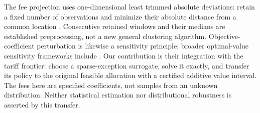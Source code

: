 The fee projection uses one-dimensional least trimmed absolute deviations: retain a fixed number of observations and minimize their absolute distance from a common location \citep{Tableman1994,Zioutas2015}. Consecutive retained windows and their medians are established preprocessing, not a new general clustering algorithm. Objective-coefficient perturbation is likewise a sensitivity principle; broader optimal-value sensitivity frameworks include \citet{XuBurer2017}. Our contribution is their integration with the tariff frontier: choose a sparse-exception surrogate, solve it exactly, and transfer its policy to the original feasible allocation with a certified additive value interval. The fees here are specified coefficients, not samples from an unknown distribution. Neither statistical estimation nor distributional robustness is asserted by this transfer.
